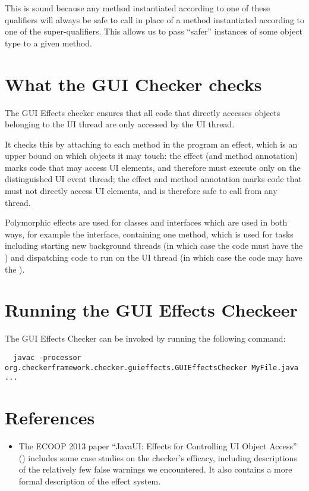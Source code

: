 This is sound because any method instantiated according to one of these qualifiers will always be
safe to call in place of a method instantiated according to one of the super-qualifiers.
This allows us to pass ``safer'' instances of some object type to a given method.

\section{What the GUI Checker checks\label{gui-checks}}
The GUI Effects checker ensures that all code that directly accesses objects belonging to the UI
thread are only accessed by the UI thread.

It checks this by attaching to each method in the program an effect, which is an upper bound on
which objects it may touch: the  effect (and method annotation) marks code that may
access UI elements, and therefore must execute only on the distinguished UI event thread; the
 effect and method annotation marks code that must not directly access UI
elements, and is therefore safe to call from any thread.

Polymorphic effects are used for classes and interfaces which are used in both ways, for example the
 interface, containing one method, which is used for tasks including
starting new background threads (in which case the code must have the ) and
dispatching code to run on the UI thread (in which case the code may have the ).

\section{Running the GUI Effects Checkeer\label{gui-running}}

The GUI Effects Checker can be invoked by running the following command:
\begin{Verbatim}
  javac -processor org.checkerframework.checker.guieffects.GUIEffectsChecker MyFile.java ...
\end{Verbatim}


\section{References\label{guieffects-references}}

\begin{itemize}
\item The ECOOP 2013 paper ``JavaUI: Effects for Controlling UI Object Access''
    ()
    includes some case
    studies on the checker's efficacy, including descriptions of the relatively few false warnings
    we encountered.
    It also contains a more formal description of the effect system.\\

\end{itemize}


